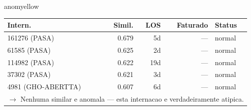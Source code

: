 \documentclass[a4paper,10pt]{article}
\begin{document}
\begin{anomalycard}[Internacao 81338 | GHO-PETROBRAS | MODERADO (z=2.03)]{anomyellow}
\begin{tabular}{l r r r l}\toprule\textbf{Intern.} & \textbf{Simil.} & \textbf{LOS} & \textbf{Faturado} & \textbf{Status} \\\midrule
161276 (PASA) & 0.679 & 5d & --- & \textcolor{jcubeblue}{normal} \\
61585 (PASA) & 0.625 & 2d & --- & \textcolor{jcubeblue}{normal} \\
114982 (PASA) & 0.622 & 19d & --- & \textcolor{jcubeblue}{normal} \\
37302 (PASA) & 0.621 & 3d & --- & \textcolor{jcubeblue}{normal} \\
4981 (GHO-ABERTTA) & 0.607 & 6d & --- & \textcolor{jcubeblue}{normal} \\
\multicolumn{5}{l}{\textcolor{jcubeblue}{\small $\rightarrow$ Nenhuma similar e anomala --- esta internacao e verdadeiramente atipica.}} \\
\bottomrule\end{tabular}


\end{anomalycard}

\newpage
\end{document}
